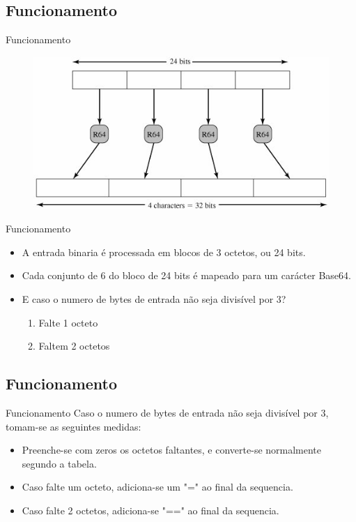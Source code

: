 \documentclass[pdf]{beamer}
\begin{document}
\subsection{Funcionamento}
\begin{frame}{Funcionamento}
\transdissolve
\begin{figure}[ht]
\begin{center}
\includegraphics[width=1\textwidth]{radix64.jpg}
\end{center}
\end{figure}
\end{frame}
\begin{frame}{Funcionamento}
\begin{itemize}
\item A entrada binaria é processada em blocos de 3 octetos, ou 24 bits.\\
\item Cada conjunto de 6 do bloco de 24 bits é mapeado para um carácter Base64.\\
\pause
\item E caso o numero de bytes de entrada não seja divisível por 3?\\
\pause
\begin{enumerate}[{Caso} 1]
\item Falte 1 octeto
\pause
\item Faltem 2 octetos
\end{enumerate}
\end{itemize}
\end{frame}
\subsection{Funcionamento}
\begin{frame}{Funcionamento}
Caso o numero de bytes de entrada não seja divisível por 3, tomam-se as seguintes medidas:
\begin{itemize}
\item Preenche-se com zeros os octetos faltantes, e converte-se normalmente segundo a tabela.
\item Caso falte um octeto, adiciona-se um "=" ao final da sequencia.
\item Caso falte 2 octetos, adiciona-se "==" ao final da sequencia.
\end{itemize}
\end{frame}
\end{document}
